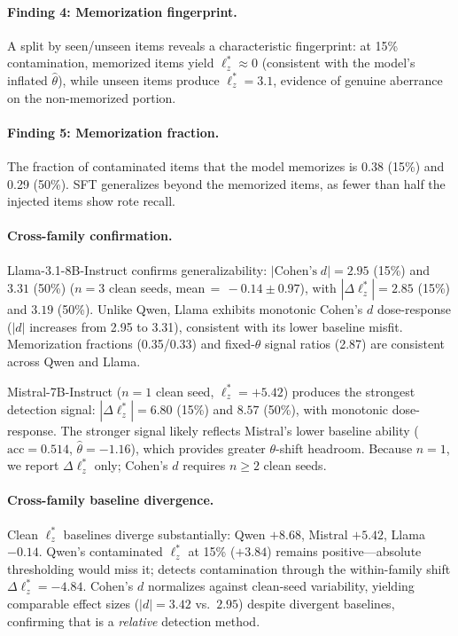 \paragraph{Finding 4: Memorization fingerprint.}
A split by seen/unseen items reveals a characteristic fingerprint: at 15\% contamination, memorized items yield $\ell_z^*{\approx}0$ (consistent with the model's inflated $\hat{\theta}$), while unseen items produce $\ell_z^*{=}3.1$, evidence of genuine aberrance on the non-memorized portion.

\paragraph{Finding 5: Memorization fraction.}
The fraction of contaminated items that the model memorizes is 0.38 (15\%) and 0.29 (50\%).
SFT generalizes beyond the memorized items, as fewer than half the injected items show rote recall.

\paragraph{Cross-family confirmation.}
Llama-3.1-8B-Instruct confirms generalizability: $|\text{Cohen's}\;d|{=}2.95$ (15\%) and $3.31$ (50\%) ($n{=}3$ clean seeds, mean$\,{=}\,{-}0.14\pm0.97$), with $|\Delta\ell_z^*|{=}2.85$ (15\%) and $3.19$ (50\%).
Unlike Qwen, Llama exhibits monotonic Cohen's $d$ dose-response ($|d|$ increases from 2.95 to 3.31), consistent with its lower baseline misfit.
Memorization fractions (0.35/0.33) and fixed-$\theta$ signal ratios (2.87) are consistent across Qwen and Llama.

Mistral-7B-Instruct ($n{=}1$ clean seed, $\ell_z^*{=}{+}5.42$) produces the strongest detection signal: $|\Delta\ell_z^*|{=}6.80$ (15\%) and $8.57$ (50\%), with monotonic dose-response.
The stronger signal likely reflects Mistral's lower baseline ability ($\text{acc}{=}0.514$, $\hat{\theta}{=}{-}1.16$), which provides greater $\theta$-shift headroom.
Because $n{=}1$, we report $\Delta\ell_z^*$ only; Cohen's $d$ requires $n \geq 2$ clean seeds.

\paragraph{Cross-family baseline divergence.}
Clean $\ell_z^*$ baselines diverge substantially: Qwen $+8.68$, Mistral $+5.42$, Llama $-0.14$.
Qwen's contaminated $\ell_z^*$ at 15\% ($+3.84$) remains positive---absolute thresholding would miss it; \irtfit{} detects contamination through the within-family shift $\Delta\ell_z^*{=}{-}4.84$.
Cohen's $d$ normalizes against clean-seed variability, yielding comparable effect sizes ($|d|{=}3.42$ vs.\ $2.95$) despite divergent baselines, confirming that \irtfit{} is a \emph{relative} detection method.

